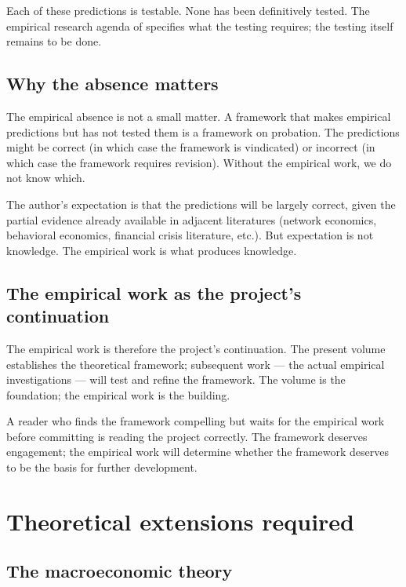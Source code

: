 Each of these predictions is testable. None has been definitively
tested. The empirical research agenda of 
specifies what the testing requires; the testing itself remains
to be done.

\subsection{Why the absence matters}

The empirical absence is not a small matter. A framework that
makes empirical predictions but has not tested them is a
framework on probation. The predictions might be correct (in
which case the framework is vindicated) or incorrect (in which
case the framework requires revision). Without the empirical
work, we do not know which.

The author's expectation is that the predictions will be largely
correct, given the partial evidence already available in adjacent
literatures (network economics, behavioral economics, financial
crisis literature, etc.). But expectation is not knowledge. The
empirical work is what produces knowledge.

\subsection{The empirical work as the project's continuation}

The empirical work is therefore the project's continuation. The
present volume establishes the theoretical framework; subsequent
work --- the actual empirical investigations --- will test and
refine the framework. The volume is the foundation; the empirical
work is the building.

A reader who finds the framework compelling but waits for the
empirical work before committing is reading the project correctly.
The framework deserves engagement; the empirical work will
determine whether the framework deserves to be the basis for
further development.

\section{Theoretical extensions required}
\label{sec:open-theoretical}

\subsection{The macroeconomic theory}

